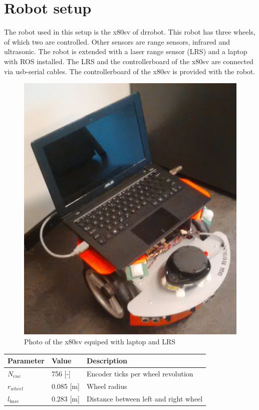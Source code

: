 \documentclass[a4paper]{article}
\begin{document}
\section{Robot setup}
The robot used in this setup is the x80sv of drrobot. This robot has three wheels, of which
two are controlled. Other sensors are range sensors, infrared and ultrasonic.
The robot is extended with a laser range
sensor (LRS) and a laptop with ROS installed. The LRS and the controllerboard of the x80sv are
connected via usb-serial cables. The controllerboard of the x80sv is provided with
the robot.

\begin{figure}[h!]
  \centering
  \includegraphics[width=\textwidth,height=\textheight,keepaspectratio]{img/fotorobot.png}
  \caption{Photo of the x80sv equiped with laptop and LRS}
\end{figure}

\begin{tabular}{ | l | l | l |}
  \hline                       
  Parameter & Value & Description\\
  \hline 
  \hline 
  $N_{enc}$ & 756 [-] & Encoder ticks per wheel revolution \\
  \hline
  $r_{wheel}$ & 0.085 [m] & Wheel radius\\
  \hline
  $l_{base}$ & 0.283 [m] & Distance between left and right wheel\\
  \hline
\end{tabular}
\end{document}
